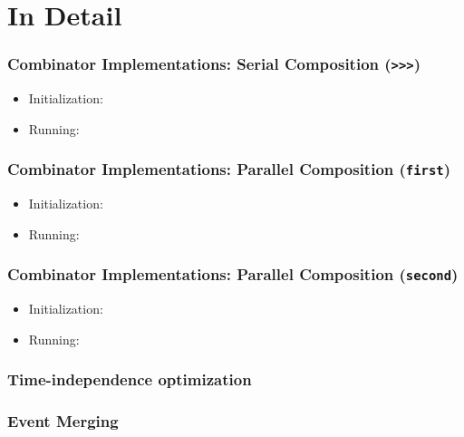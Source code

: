 \documentclass{beamer}
\begin{document}
\section{In Detail}

\begin{frame}
\frametitle{Combinator Implementations: Serial Composition ({\tt >>>})}
    \begin{itemize}
        \item Initialization:
        \item Running:
    \end{itemize}
\end{frame}

\begin{frame}
\frametitle{Combinator Implementations: Parallel Composition ({\tt first})}
    \begin{itemize}
        \item Initialization:
        \item Running:
    \end{itemize}
\end{frame}

\begin{frame}
\frametitle{Combinator Implementations: Parallel Composition ({\tt second})}
    \begin{itemize}
        \item Initialization:
        \item Running:
    \end{itemize}
\end{frame}

\begin{frame}
\frametitle{Time-independence optimization}
\end{frame}

\begin{frame}
\frametitle{Event Merging}
\end{frame}
\end{document}
